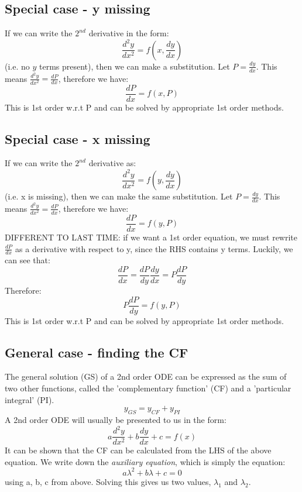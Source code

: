 \documentclass{article}
\begin{document}
\subsection{Special case - y missing}
If we can write the $ 2^{nd} $ derivative in the form:
\begin{equation}
\frac{d^{2}y}{dx^{2}} = f(x, \frac{dy}{dx})
\end{equation}
(i.e. no $ y $ terms present), then we can make a substitution. Let $ P = \frac{dy}{dx} $. This means $ \frac{d^{2}y}{dx^{2}} = \frac{dP}{dx} $, therefore we have:
\begin{equation}
\frac{dP}{dx} = f(x, P)
\end{equation}
This is 1st order w.r.t P and can be solved by appropriate 1st order methods.

\subsection{Special case - x missing}
If we can write the $ 2^{nd} $ derivative as:
\begin{equation}
\frac{d^{2}y}{dx^{2}} = f(y, \frac{dy}{dx})
\end{equation}
(i.e. x is missing), then we can make the same substitution. Let $ P = \frac{dy}{dx} $. This means $ \frac{d^{2}y}{dx^{2}} = \frac{dP}{dx} $, therefore we have:
\begin{equation}
\frac{dP}{dx} = f(y, P)
\end{equation}
DIFFERENT TO LAST TIME: if we want a 1st order equation, we must rewrite $ \frac{dP}{dx} $ as a derivative with respect to y, since the RHS contains y terms. Luckily, we can see that:
\begin{equation}
\frac{dP}{dx} = \frac{dP}{dy}\frac{dy}{dx} = P\frac{dP}{dy}
\end{equation}
Therefore:
\begin{equation}
P\frac{dP}{dy} = f(y, P)
\end{equation}
This is 1st order w.r.t P and can be solved by appropriate 1st order methods.

\subsection{General case - finding the CF}
The general solution (GS) of a 2nd order ODE can be expressed as the sum of two other functions, called the 'complementary function' (CF) and a 'particular integral' (PI).
\begin{equation}
y_{GS} = y_{CF} + y_{PI}
\end{equation} 
A 2nd order ODE will usually be presented to us in the form:
\begin{equation} \label{secondordergeneralform}
a\frac{d^{2}y}{dx^{2}} + b\frac{dy}{dx} + c = f(x)
\end{equation}
It can be shown that the CF can be calculated from the LHS of the above equation. We write down the \emph{auxiliary equation}, which is simply the equation:
\begin{equation}
a\lambda^{2} + b\lambda + c = 0
\end{equation}
using a, b, c from above. Solving this gives us two values, $ \lambda_{1} $ and $ \lambda_{2} $.
\end{document}
